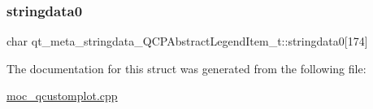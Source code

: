 \subsubsection{\texorpdfstring{stringdata0}{stringdata0}}
{\footnotesize\ttfamily char qt\+\_\+meta\+\_\+stringdata\+\_\+\+Q\+C\+P\+Abstract\+Legend\+Item\+\_\+t\+::stringdata0\mbox{[}174\mbox{]}}



The documentation for this struct was generated from the following file\+:\begin{DoxyCompactItemize}
\item 
\mbox{\hyperlink{moc__qcustomplot_8cpp}{moc\+\_\+qcustomplot.\+cpp}}\end{DoxyCompactItemize}
